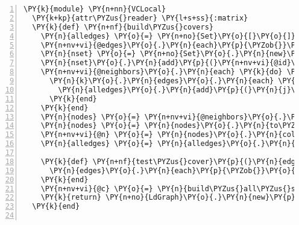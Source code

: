\begin{Verbatim}[commandchars=\\\{\},numbers=left,firstnumber=1,stepnumber=1,xleftmargin=7mm, fontsize=\small]
\PY{k}{module} \PY{n+nn}{VCLocal}
  \PY{k+kp}{attr\PYZus{}reader} \PY{l+s+ss}{:matrix}
  \PY{k}{def} \PY{n+nf}{build\PYZus{}covers}
    \PY{n}{alledges} \PY{o}{=} \PY{n+no}{Set}\PY{o}{[}\PY{o}{]}
    \PY{n+nv+vi}{@edges}\PY{o}{.}\PY{n}{each}\PY{p}{\PYZob{}}\PY{o}{|}\PY{n}{k}\PY{o}{|} \PY{n}{alledges}\PY{o}{.}\PY{n}{add}\PY{p}{(}\PY{n}{k}\PY{p}{)}\PY{p}{\PYZcb{}}
    \PY{n}{nset} \PY{o}{=} \PY{n+no}{Set}\PY{o}{.}\PY{n}{new}\PY{p}{(}\PY{n+nv+vi}{@neighbors}\PY{o}{.}\PY{n}{collect}\PY{p}{\PYZob{}}\PY{o}{|}\PY{n}{k}\PY{o}{|} \PY{n}{k}\PY{o}{.}\PY{n}{id}\PY{p}{\PYZcb{}}\PY{p}{)}
    \PY{n}{nset}\PY{o}{.}\PY{n}{add}\PY{p}{(}\PY{n+nv+vi}{@id}\PY{p}{)}
    \PY{n+nv+vi}{@neighbors}\PY{o}{.}\PY{n}{each} \PY{k}{do} \PY{o}{|}\PY{n}{k}\PY{o}{|} 
      \PY{n}{k}\PY{o}{.}\PY{n}{edges}\PY{o}{.}\PY{n}{each} \PY{k}{do} \PY{o}{|}\PY{n}{j}\PY{o}{|} 
        \PY{n}{alledges}\PY{o}{.}\PY{n}{add}\PY{p}{(}\PY{n}{j}\PY{p}{)} \PY{k}{if} \PY{n}{j}\PY{o}{.}\PY{n}{proper\PYZus{}subset?}\PY{p}{(}\PY{n}{nset}\PY{p}{)}
      \PY{k}{end}
    \PY{k}{end}
    \PY{n}{nodes} \PY{o}{=} \PY{n+nv+vi}{@neighbors}\PY{o}{.}\PY{n}{to\PYZus{}set}\PY{o}{.}\PY{n}{add}\PY{p}{(}\PY{n+nb}{self}\PY{p}{)}
    \PY{n}{nodes} \PY{o}{=} \PY{n}{nodes}\PY{o}{.}\PY{n}{to\PYZus{}a}
    \PY{n+nv+vi}{@n} \PY{o}{=} \PY{n}{nodes}\PY{o}{.}\PY{n}{collect}\PY{p}{\PYZob{}}\PY{o}{|}\PY{n}{k}\PY{o}{|} \PY{n}{k}\PY{o}{.}\PY{n}{id}\PY{p}{\PYZcb{}}
    \PY{n}{alledges} \PY{o}{=} \PY{n}{alledges}\PY{o}{.}\PY{n}{to\PYZus{}a}    
    
    \PY{k}{def} \PY{n+nf}{test\PYZus{}cover}\PY{p}{(}\PY{n}{edges}\PY{p}{,} \PY{n}{cover}\PY{p}{)}
      \PY{n}{edges}\PY{o}{.}\PY{n}{each}\PY{p}{\PYZob{}}\PY{o}{|}\PY{n}{k}\PY{o}{|} \PY{k}{return} \PY{k+kp}{false} \PY{k}{if} \PY{n}{cover}\PY{o}{-}\PY{n}{k} \PY{o}{==} \PY{n}{cover}\PY{p}{\PYZcb{}} 
    \PY{k}{end}
    \PY{n+nv+vi}{@c} \PY{o}{=} \PY{n}{build\PYZus{}all\PYZus{}subsets}\PY{o}{.}\PY{n}{select}\PY{p}{\PYZob{}}\PY{o}{|}\PY{n}{k}\PY{o}{|} \PY{n}{test\PYZus{}cover}\PY{p}{(}\PY{n}{alledges}\PY{p}{,} \PY{n}{k}\PY{p}{)}\PY{p}{\PYZcb{}}\PY{o}{.}\PY{n}{to\PYZus{}set}
    \PY{k}{return} \PY{n+no}{LdGraph}\PY{o}{.}\PY{n}{new}\PY{p}{(}\PY{n+nv+vi}{@c}\PY{p}{,} \PY{n}{nodes}\PY{p}{)}
  \PY{k}{end}


\end{Verbatim}
